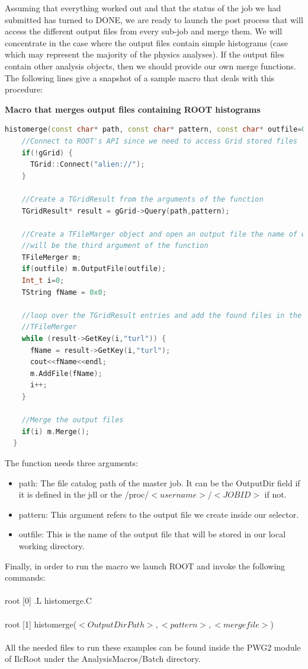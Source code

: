 Assuming that everything worked out and that the status of the job we had submitted has turned to {\ttfamily DONE}, we are ready to launch the post process that will access the different output files from every sub-job and merge them. We will concentrate in the case where the output files contain simple histograms (case which may represent the majority of the physics analyses). If the output files contain other analysis objects, then we should provide our own merge functions. The following lines give a snapshot of a sample macro that deals with this procedure:

\vspace{0.5 cm}
\textbf{Macro that merges output files containing ROOT histograms}
\begin{lstlisting}[language=C++]
  histomerge(const char* path, const char* pattern, const char* outfile=0){
    //Connect to ROOT's API since we need to access Grid stored files
    if(!gGrid) {
      TGrid::Connect("alien://");
    }
    
    //Create a TGridResult from the arguments of the function
    TGridResult* result = gGrid->Query(path,pattern);

    //Create a TFileMarger object and open an output file the name of which 
    //will be the third argument of the function
    TFileMerger m;
    if(outfile) m.OutputFile(outfile);
    Int_t i=0;
    TString fName = 0x0;

    //loop over the TGridResult entries and add the found files in the 
    //TFileMerger
    while (result->GetKey(i,"turl")) {
      fName = result->GetKey(i,"turl");
      cout<<fName<<endl;
      m.AddFile(fName);
      i++;
    }

    //Merge the output files
    if(i) m.Merge();
  }
\end{lstlisting}

The function needs three arguments:

\begin{itemize}
\item {\ttfamily path:} The file catalog path of the master job. It can be the {\ttfamily OutputDir} field if it is defined in the jdl or the {\ttfamily /proc/$<username>/<JOBID>$} if not.
\item {\ttfamily pattern:} This argument refers to the output file we create inside our selector.
\item {\ttfamily outfile:} This is the name of the output file that will be stored in our local working directory.
\end{itemize}

Finally, in order to run the macro we launch ROOT and invoke the following commands: \\
\\
{\ttfamily root [0] .L histomerge.C}\\
\\
{\ttfamily root [1] histomerge($<OutputDirPath>,<pattern>,<mergefile>$)}\\
\\

All the needed files to run these examples can be found inside the PWG2 module of IlcRoot under the AnalysisMacros/Batch directory.

